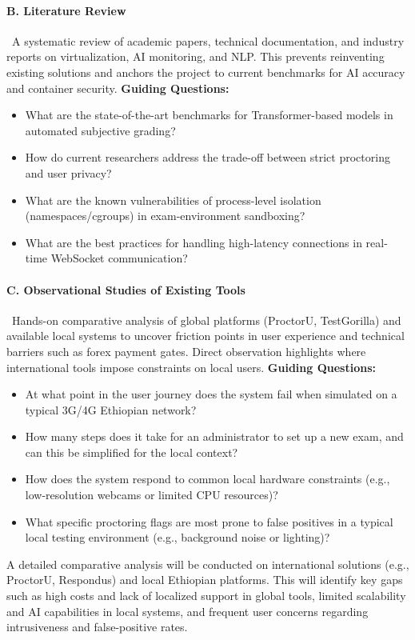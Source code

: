 \paragraph{B. Literature Review}\
A systematic review of academic papers, technical documentation, and industry reports on virtualization, AI monitoring, and NLP. This prevents reinventing existing solutions and anchors the project to current benchmarks for AI accuracy and container security.
\textbf{Guiding Questions:}
\begin{itemize}
    \item What are the state-of-the-art benchmarks for Transformer-based models in automated subjective grading?
    \item How do current researchers address the trade-off between strict proctoring and user privacy?
    \item What are the known vulnerabilities of process-level isolation (namespaces/cgroups) in exam-environment sandboxing?
    \item What are the best practices for handling high-latency connections in real-time WebSocket communication?
\end{itemize}

\paragraph{C. Observational Studies of Existing Tools}\
Hands-on comparative analysis of global platforms (ProctorU, TestGorilla) and available local systems to uncover friction points in user experience and technical barriers such as forex payment gates. Direct observation highlights where international tools impose constraints on local users.
\textbf{Guiding Questions:}
\begin{itemize}
    \item At what point in the user journey does the system fail when simulated on a typical 3G/4G Ethiopian network?
    \item How many steps does it take for an administrator to set up a new exam, and can this be simplified for the local context?
    \item How does the system respond to common local hardware constraints (e.g., low-resolution webcams or limited CPU resources)?
    \item What specific proctoring flags are most prone to false positives in a typical local testing environment (e.g., background noise or lighting)?
\end{itemize}
A detailed comparative analysis will be conducted on international solutions (e.g., ProctorU, Respondus) and local Ethiopian platforms. This will identify key gaps such as high costs and lack of localized support in global tools, limited scalability and AI capabilities in local systems, and frequent user concerns regarding intrusiveness and false-positive rates.


